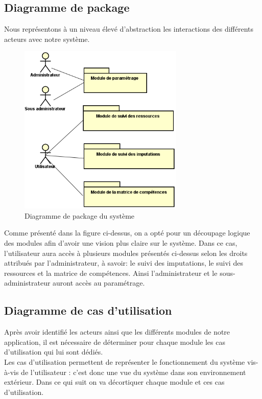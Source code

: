 \subsection{Diagramme de package}
Nous représentons à un niveau élevé d’abstraction les interactions des différents acteurs avec notre système.
\begin{figure}[h!]  
  \centering
    \includegraphics[width=0.7\textwidth]{chapitre2/Figures/package.png}
  \caption{Diagramme de package du système}
\end{figure}
\newpage
Comme présenté dans la figure ci-dessus, on a opté pour un découpage logique des modules afin d’avoir une vision plus claire sur le système. Dans ce cas, l'utilisateur aura accès à plusieurs modules présentés ci-dessus selon les droits attribués par l'administrateur, à savoir: le suivi des imputations, le suivi des ressources et la matrice de compétences. Ainsi l'administrateur et le sous-administrateur auront accès au paramétrage.
\subsection{Diagramme de cas d'utilisation}
Après avoir identifié les acteurs ainsi que les différents modules de notre application, il est nécessaire de déterminer pour
chaque module les cas d’utilisation qui lui sont dédiés.\\
Les cas d’utilisation permettent de représenter le fonctionnement du système vis-à-vis de l’utilisateur : c’est donc une vue du système dans son environnement extérieur. Dans ce qui suit on va décortiquer chaque module et ces cas d'utilisation.\\




